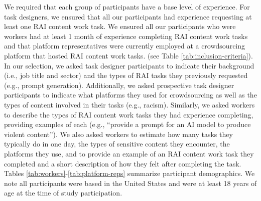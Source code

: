 We required that each group of participants have a base level of experience. For task designers, we ensured that all our participants had experience requesting at least one RAI content work task. We ensured all our participants who were workers had at least 1 month of experience completing RAI content work tasks and that platform representatives were currently employed at a crowdsourcing platform that hosted RAI content work tasks. (see Table \ref{tab:inclusion-criteria}). In our selection, we asked task designer participants to indicate their background (i.e., job title and sector) and the types of RAI tasks they previously requested (e.g., prompt generation). Additionally, we asked prospective task designer participants to indicate what platforms they used for crowdsourcing as well as the types of content involved in their tasks (e.g., racism). Similarly, we asked workers to describe the types of RAI content work tasks they had experience completing, providing examples of each (e.g., ``provide a prompt for an AI model to produce violent content''). We also asked workers to estimate how many tasks they typically do in one day, the types of sensitive content they encounter, the platforms they use, and to provide an example of an RAI content work task they completed and a short description of how they felt after completing the task. Tables \ref{tab:workers}-\ref{tab:platform-reps} summarize participant demographics. We note all participants were based in the United States and were at least 18 years of age at the time of study participation. 







